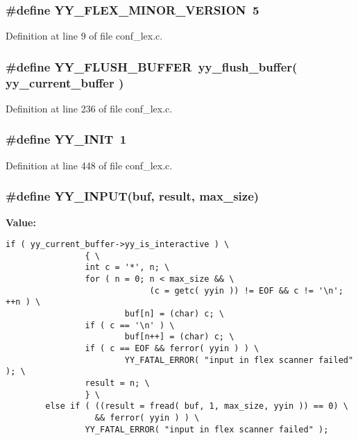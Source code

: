 \subsubsection{\setlength{\rightskip}{0pt plus 5cm}\#define YY\_\-FLEX\_\-MINOR\_\-VERSION\ 5}\label{conf__lex_8c_a2}




Definition at line 9 of file conf\_\-lex.c.
\subsubsection{\setlength{\rightskip}{0pt plus 5cm}\#define YY\_\-FLUSH\_\-BUFFER\ yy\_\-flush\_\-buffer( yy\_\-current\_\-buffer )}\label{conf__lex_8c_a23}




Definition at line 236 of file conf\_\-lex.c.
\subsubsection{\setlength{\rightskip}{0pt plus 5cm}\#define YY\_\-INIT\ 1}\label{conf__lex_8c_a40}




Definition at line 448 of file conf\_\-lex.c.
\subsubsection{\setlength{\rightskip}{0pt plus 5cm}\#define YY\_\-INPUT(buf, result, max\_\-size)}\label{conf__lex_8c_a54}


{\bf Value:}

\footnotesize\begin{verbatim}if ( yy_current_buffer->yy_is_interactive ) \
                { \
                int c = '*', n; \
                for ( n = 0; n < max_size && \
                             (c = getc( yyin )) != EOF && c != '\n'; ++n ) \
                        buf[n] = (char) c; \
                if ( c == '\n' ) \
                        buf[n++] = (char) c; \
                if ( c == EOF && ferror( yyin ) ) \
                        YY_FATAL_ERROR( "input in flex scanner failed" ); \
                result = n; \
                } \
        else if ( ((result = fread( buf, 1, max_size, yyin )) == 0) \
                  && ferror( yyin ) ) \
                YY_FATAL_ERROR( "input in flex scanner failed" );
\end{verbatim}\normalsize 


